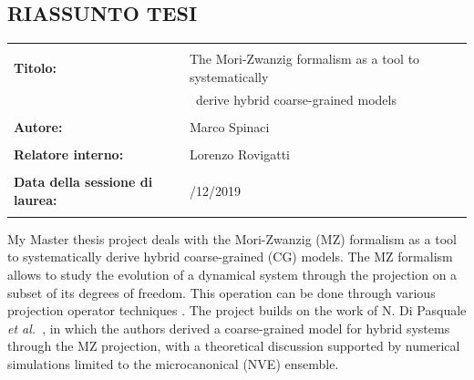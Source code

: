 \documentclass[10pt,a4paper]{article}
\begin{document}
\begin{center}
\section*{RIASSUNTO TESI}
\end{center}


\begin{table}[ht] %
\centering
\begin{tabular}{@{}l@{}l@{}}
 \hline
 &\\
 \textbf{Titolo:}&\;The Mori-Zwanzig formalism as a tool to systematically \\ 
 &\ derive hybrid coarse-grained models\\ 
 &\\
 \textbf{Autore:}&\;Marco Spinaci\\
 &\\
 \textbf{Relatore interno:}&\;Lorenzo Rovigatti\\
 &\\
 \textbf{Data della sessione di laurea:}&\;16/12/2019\\
 &\\ 
 \hline
\end{tabular}
\end{table}


My Master thesis project deals with the Mori-Zwanzig (MZ) formalism as a tool to systematically derive hybrid coarse-grained (CG) models. The MZ formalism allows to study the evolution of a dynamical system through the projection on a subset of its degrees of freedom. This operation can be done through various projection operator techniques \cite{Grabert:Projection}. 
%
%
The project builds on the work of N. Di Pasquale \emph{et al.}~\cite{DiPasquale2019}, in which the authors derived a coarse-grained model for hybrid systems through the MZ projection, with a theoretical discussion supported by numerical simulations limited to the microcanonical (NVE) ensemble.
%
\end{document}
